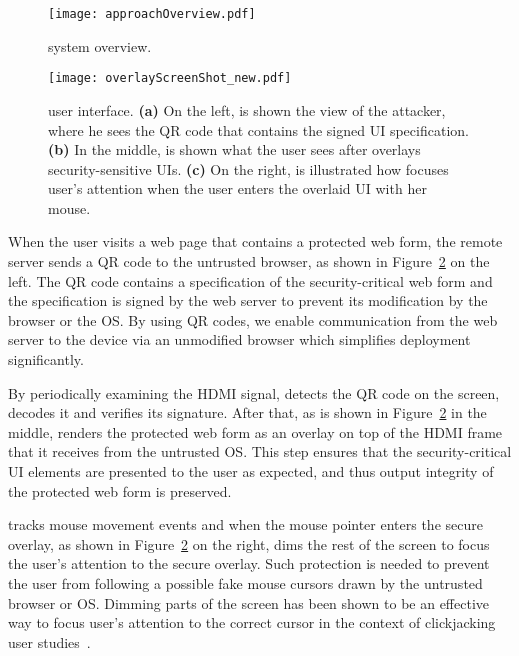 \begin{figure}[t]
	\centering
	\texttt{[image: approachOverview.pdf]}
	\caption{\protection system overview.}
	\label{fig:architecture}
\end{figure}

\begin{figure}[t]
	\centering
	\texttt{[image: overlayScreenShot\_new.pdf]}
	\caption{\protection user interface. \textbf{(a)} On the left, is shown the view of the attacker, where he sees the QR code that contains the signed UI specification. \textbf{(b)} In the middle, is shown what the user sees after \hub overlays security-sensitive UIs. \textbf{(c)} On the right, is illustrated how \protection focuses user's attention when the user enters the overlaid UI with her mouse.}
	\label{fig:screenshot}
\end{figure}

When the user visits a web page that contains a protected web form, the remote server sends a QR code to the untrusted browser, as shown in Figure~\ref{fig:screenshot} on the left. The QR code contains a specification of the security-critical web form and the specification is signed by the web server to prevent its modification by the browser or the OS. By using QR codes, we enable communication from the web server to the \hub device via an unmodified browser which simplifies deployment significantly.

By periodically examining the HDMI signal, \hub detects the QR code on the screen, decodes it and verifies its signature. After that, as is shown in Figure~\ref{fig:screenshot} in the middle, \hub renders the protected web form as an overlay on top of the HDMI frame that it receives from the untrusted OS. This step ensures that the security-critical UI elements are presented to the user as expected, and thus output integrity of the protected web form is preserved.

\hub tracks mouse movement events and when the mouse pointer enters the secure overlay, as shown in Figure~\ref{fig:screenshot} on the right, \hub dims the rest of the screen to focus the user's attention to the secure overlay. Such protection is needed to prevent the user from following a possible fake mouse cursors drawn by the untrusted browser or OS. Dimming parts of the screen has been shown to be an effective way to focus user's attention to the correct cursor in the context of clickjacking user studies~\cite{huang2012clickjacking}.

